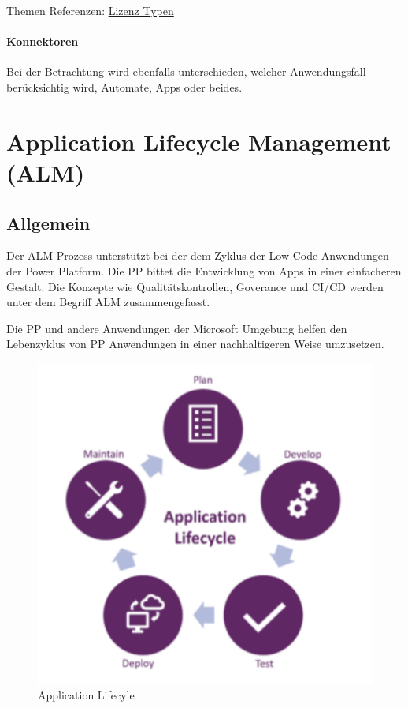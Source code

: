 Themen Referenzen: \href{https://docs.microsoft.com/de-de/power-platform/admin/power-automate-licensing/types}{Lizenz Typen}

\paragraph{Konnektoren}
Bei der Betrachtung wird ebenfalls unterschieden, welcher Anwendungsfall berücksichtig wird, Automate, Apps oder beides.

\section{Application Lifecycle Management (ALM)} 

\subsection{Allgemein}
Der \gls{ALM} Prozess unterstützt bei der dem Zyklus der Low-Code Anwendungen der Power Platform. Die \gls{PP} bittet die Entwicklung von Apps in einer einfacheren Gestalt. Die Konzepte wie Qualitätskontrollen, Goverance und \gls{CI}/\gls{CD} werden unter dem Begriff \gls{ALM} zusammengefasst.\\

\begin{center}
	Die \gls{PP} und andere Anwendungen der Microsoft Umgebung helfen den Lebenzyklus von \gls{PP} Anwendungen in einer nachhaltigeren Weise umzusetzen.
\end{center}

\begin{figure}[H]
	\centering
	\includegraphics[scale = 0.3]{attachment/chapter_13/Scc026}
	\caption{Application Lifecyle} 
\end{figure}

